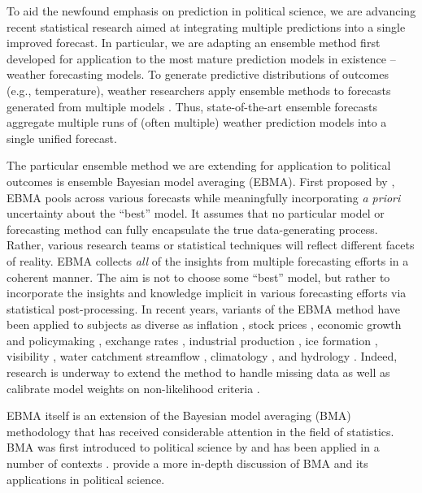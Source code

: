 To aid the newfound emphasis on prediction in political science, we
are advancing recent statistical research aimed at integrating
multiple predictions into a single improved forecast.  In particular,
we are adapting an ensemble method first developed for application to
the most mature prediction models in existence -- weather forecasting
models.  To generate predictive distributions of outcomes (e.g.,
temperature), weather researchers apply ensemble methods to forecasts
generated from multiple models \citep{Raftery:2005}.  Thus,
state-of-the-art ensemble forecasts aggregate multiple runs of (often
multiple) weather prediction models into a single unified forecast.

The particular ensemble method we are extending for application to
political outcomes is ensemble Bayesian model averaging (EBMA). First
proposed by \citet{Raftery:2005}, EBMA pools across various forecasts
while meaningfully incorporating \textit{a priori} uncertainty about
the ``best'' model.  It assumes that no particular model or
forecasting method can fully encapsulate the true data-generating
process.  Rather, various research teams or statistical techniques
will reflect different facets of reality. EBMA collects \textit{all}
of the insights from multiple forecasting efforts in a coherent
manner.  The aim is not to choose some ``best'' model, but rather to
incorporate the insights and knowledge implicit in various forecasting
efforts via statistical post-processing.  In recent years, variants of
the EBMA method have been applied to subjects as diverse as inflation
\citep{Wright:2009, Koop:2010, Gneiting:2010}, stock prices
\citep{Billio:2011}, economic growth and policymaking
\citep{Brock:2007, Billio:2010}, exchange rates \citep{Wright:2008},
industrial production \citep{Feldkircher:2010}, ice formation
\citep{Berrocal:2010}, visibility \citep{Chmielecki:2010}, water
catchment streamflow \citep{Viney:2009}, climatology \citep{Min:2006,
  Min:2007, Smith:2009}, and hydrology \citep{Zhang:2009}.  Indeed,
research is underway to extend the method to handle missing data
\citep{Fraley:2010, Mccandless:2011} as well as calibrate model
weights on non-likelihood criteria \citep[e.g.,][]{Vrugt:2006}.

EBMA itself is an extension of the Bayesian model averaging (BMA)
methodology \citep[c.f.,][]{Madigan:1994, Draper:1995, Raftery:1995,
  Hoeting:1999, Clyde:2003, Raftery:2003, Clyde:2004} that has
received considerable attention in the field of statistics. BMA was
first introduced to political science by \citet{Bartels:1997} and has
been applied in a number of contexts \citep[e.g.,][]{Bartels:2001,
  Gill:2004, Imai:2004,
  Geer:2006b}. 
provide a more in-depth discussion of BMA and its applications in
political science.



